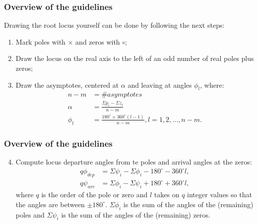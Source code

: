 \begin{frame}
\frametitle{Overview of the guidelines}
	\begin{block}{}
	Drawing the root locus yourself can be done by following the next steps:
	\vspace{0.5em}
	\begin{enumerate}
		\item Mark poles with $\times$ and zeros with $\circ$;
		\item Draw the locus on the real axis to the left of an odd number of real poles plus zeros;
		\item Draw the asymptotes, centered at $\alpha$ and leaving at angles $\phi_l$, where:
		\vspace{-0.5em}
		\begin{align*}
			n - m &=  \# asymptotes\\
			\alpha &= \frac{\varSigma p_i - \varSigma z_i}{n-m}\\
			\phi_l &= \frac{180^{\circ} + 360^{\circ}(l - 1)}{n - m}, l = 1,2,...,n-m.
		\end{align*}
	\end{enumerate}
	\end{block}
\end{frame}

\begin{frame}
\frametitle{Overview of the guidelines}
	\begin{block}{}
	\begin{enumerate}
	\setcounter{enumi}{3}
	\item Compute locus departure angles from te poles and arrival angles at the zeros:
	\begin{align*}
	q\phi_{dep} &= \varSigma\psi_i - \varSigma\phi_i - 180^{\circ} - 360^{\circ}l,\\
	q\psi_{arr} &= \varSigma\phi_i - \varSigma\psi_i + 180^{\circ} + 360^{\circ}l,
	\end{align*}
	where $q$ is the order of the pole or zero and $l$ takes on $q$ integer values so that the angles are between $\pm180^{\circ}$. $\Sigma \phi_i$ is the sum of the angles of the (remaining) poles and $\Sigma \psi_i$ is the sum of the angles of the (remaining) zeros.
	\end{enumerate}
	\end{block}
\end{frame}

